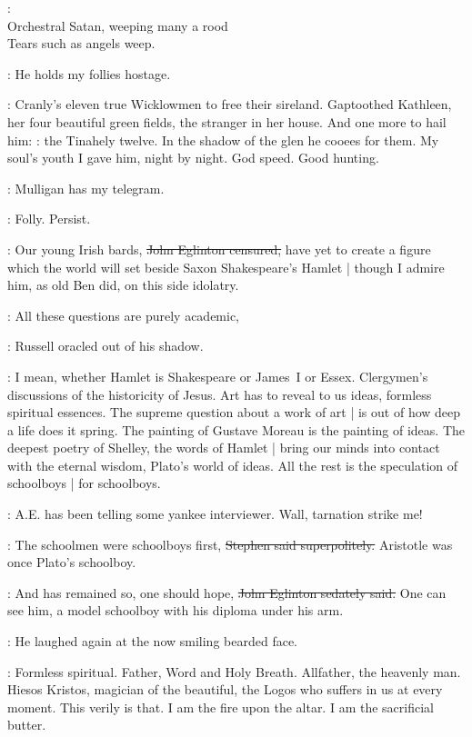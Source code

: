\StephenInt: \\
    Orchestral Satan, weeping many a rood \\
    Tears such as angels weep. \\

\StephenInt:
He holds my follies hostage.

\StephenInt:
Cranly's eleven true Wicklowmen to free their sireland.
Gaptoothed Kathleen,
her four beautiful green fields,
the stranger in her house.
And one more to hail him:
:
the Tinahely twelve.
In the shadow of the glen
he cooees for them.
My soul's youth I gave him, night by night.
God speed.
Good hunting.%

\StephenInt:
Mulligan has my telegram.

\StephenInt:
Folly. Persist.

\eglinton:
Our young Irish bards,
\sout{John Eglinton censured,}
have yet to create a figure
which the world will set beside Saxon Shakespeare's Hamlet |
though I admire him,
as old Ben did,
on this side idolatry.

\AErussell:
All these questions are purely academic,

:
Russell oracled out of his shadow.

\AErussell:
I mean, whether Hamlet is Shakespeare or James~I or Essex.
Clergymen's discussions of the historicity of Jesus.
Art has to reveal to us ideas,
formless spiritual essences.
The supreme question about a work of art |
is out of how deep a life does it spring.
The painting of Gustave Moreau is the painting of ideas.
The deepest poetry of Shelley,
the words of Hamlet |
bring our minds into contact with the eternal wisdom,
Plato's world of ideas.
All the rest is the speculation of schoolboys |
for schoolboys.

\StephenInt:
A.E. has been telling some yankee interviewer.
Wall, tarnation strike me!

\Stephen:
The schoolmen were schoolboys first,
\sout{Stephen said superpolitely.}
Aristotle was once Plato's schoolboy.

\eglinton:
And has remained so,
one should hope,
\sout{John Eglinton sedately said.}
One can see him,
a model schoolboy with his diploma under his arm.

:
He laughed again
at the now smiling bearded face.

\StephenInt:
Formless spiritual.
Father, Word and Holy Breath.
Allfather, the heavenly man.
Hiesos Kristos, magician of the beautiful,
the Logos who suffers in us at every moment.
This verily is that.
I am the fire upon the altar.
I am the sacrificial butter.

